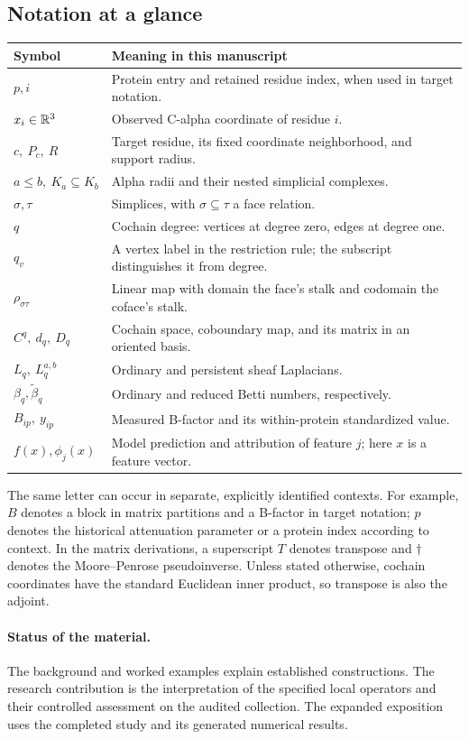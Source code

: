 \clearpage
\subsection*{Notation at a glance}
\begin{center}\small
\begin{tabularx}{\linewidth}{lX}\toprule
Symbol & Meaning in this manuscript\\\midrule
$p,i$ & Protein entry and retained residue index, when used in target notation.\\
$x_i\in\mathbb{R}^3$ & Observed C-alpha coordinate of residue $i$.\\
$c,\ P_c,\ R$ & Target residue, its fixed coordinate neighborhood, and support radius.\\
$a\leq b,\ K_a\subseteq K_b$ & Alpha radii and their nested simplicial complexes.\\
$\sigma,\tau$ & Simplices, with $\sigma\subseteq\tau$ a face relation.\\
$q$ & Cochain degree: vertices at degree zero, edges at degree one.\\
$q_v$ & A vertex label in the restriction rule; the subscript distinguishes it from degree.\\
$\rho_{\sigma\tau}$ & Linear map with domain the face's stalk and codomain the coface's stalk.\\
$C^q,\ d_q,\ D_q$ & Cochain space, coboundary map, and its matrix in an oriented basis.\\
$L_q,\ L_q^{a,b}$ & Ordinary and persistent sheaf Laplacians.\\
$\beta_q,\widetilde\beta_q$ & Ordinary and reduced Betti numbers, respectively.\\
$B_{ip},\ y_{ip}$ & Measured B-factor and its within-protein standardized value.\\
$f(x),\phi_j(x)$ & Model prediction and attribution of feature $j$; here $x$ is a feature vector.\\\bottomrule
\end{tabularx}
\end{center}
The same letter can occur in separate, explicitly identified contexts. For example, $B$ denotes a block in matrix partitions and a B-factor in target notation; $p$ denotes the historical attenuation parameter or a protein index according to context. In the matrix derivations, a superscript $T$ denotes transpose and $\dagger$ denotes the Moore--Penrose pseudoinverse. Unless stated otherwise, cochain coordinates have the standard Euclidean inner product, so transpose is also the adjoint.

\paragraph{Status of the material.}
The background and worked examples explain established constructions. The research contribution is the interpretation of the specified local operators and their controlled assessment on the audited collection. The expanded exposition uses the completed study and its generated numerical results.
